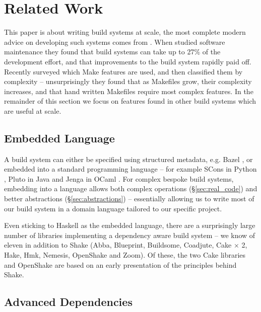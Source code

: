 \vspace{-1mm}
\section{Related Work\label{section-review}}
\vspace{-1mm}

This paper is about writing build systems at scale, the most complete modern advice on developing such systems comes from \citet{smith:software_build_systems}. When
\citet{mcintosh:build_maintenance_effort} studied software maintenance they
found that build systems can take up to 27\% of the
development effort, and that improvements to the build system rapidly paid off.
Recently \citet{martin:make_it_simple} surveyed which Make features are used,
and then \citet{martin:maintenance_complexity_makefiles} classified them by
complexity -- unsurprisingly they found that as Makefiles grow, their complexity
increases, and that hand written Makefiles require most complex features. In
the remainder of this section we focus on features found in other
build systems which are useful at scale.

\vspace{-0.5mm}
\subsection{Embedded Language}
\vspace{-0.5mm}

A build system can either be specified using structured metadata, e.g. Bazel
\cite{bazel}, or embedded into a standard programming language -- for example
SCons in Python \cite{scons}, Pluto in Java \cite{pluto} and Jenga in OCaml
\cite{jenga}. For complex bespoke build systems, embedding into a language
allows both complex operations (\S\ref{sec:real_code}) and better abstractions
(\S\ref{sec:abstractions}) -- essentially allowing us to write most of our build
system in a domain language tailored to our specific project.

Even sticking to Haskell as the embedded language, there are a surprisingly
large number of libraries implementing a dependency aware build system -- we
know of eleven in addition to Shake (Abba, Blueprint, Buildsome, Coadjute, Cake
$\times$ 2, Hake, Hmk, Nemesis, OpenShake and Zoom). Of these, the two Cake
libraries and OpenShake are based on an early presentation of the principles behind Shake.

\vspace{-0.5mm}
\subsection{Advanced Dependencies}
\vspace{-0.5mm}

